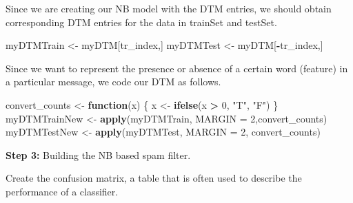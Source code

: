 \documentclass[]{article}
\newenvironment{Shaded}{\begin{snugshade}}{\end{snugshade}}
\newcommand{\CommentTok}[1]{\textcolor[rgb]{0.56,0.35,0.01}{\textit{#1}}}
\newcommand{\ControlFlowTok}[1]{\textcolor[rgb]{0.13,0.29,0.53}{\textbf{#1}}}
\newcommand{\DataTypeTok}[1]{\textcolor[rgb]{0.13,0.29,0.53}{#1}}
\newcommand{\DecValTok}[1]{\textcolor[rgb]{0.00,0.00,0.81}{#1}}
\newcommand{\KeywordTok}[1]{\textcolor[rgb]{0.13,0.29,0.53}{\textbf{#1}}}
\newcommand{\NormalTok}[1]{#1}
\newcommand{\OperatorTok}[1]{\textcolor[rgb]{0.81,0.36,0.00}{\textbf{#1}}}
\newcommand{\StringTok}[1]{\textcolor[rgb]{0.31,0.60,0.02}{#1}}
\begin{document}
Since we are creating our NB model with the DTM entries, we should
obtain corresponding DTM entries for the data in trainSet and testSet.

\begin{Shaded}
\begin{Highlighting}[]
\NormalTok{myDTMTrain <-}\StringTok{ }\NormalTok{myDTM[tr_index,]}
\NormalTok{myDTMTest <-}\StringTok{ }\NormalTok{myDTM[}\OperatorTok{-}\NormalTok{tr_index,]}
\end{Highlighting}
\end{Shaded}

Since we want to represent the presence or absence of a certain word
(feature) in a particular message, we code our DTM as follows.

\begin{Shaded}
\begin{Highlighting}[]
\NormalTok{convert_counts <-}\StringTok{ }\ControlFlowTok{function}\NormalTok{(x) \{}
\NormalTok{  x <-}\StringTok{ }\KeywordTok{ifelse}\NormalTok{(x }\OperatorTok{>}\StringTok{ }\DecValTok{0}\NormalTok{, }\StringTok{"T"}\NormalTok{, }\StringTok{"F"}\NormalTok{)}
\NormalTok{\}}
\NormalTok{myDTMTrainNew <-}\StringTok{ }\KeywordTok{apply}\NormalTok{(myDTMTrain, }\DataTypeTok{MARGIN =} \DecValTok{2}\NormalTok{,convert_counts)}
\NormalTok{myDTMTestNew <-}\StringTok{ }\KeywordTok{apply}\NormalTok{(myDTMTest, }\DataTypeTok{MARGIN =} \DecValTok{2}\NormalTok{, convert_counts)}
\end{Highlighting}
\end{Shaded}

\textbf{Step 3:} Building the NB based spam filter.

\begin{Shaded}
\end{Shaded}

Create the confusion matrix, a table that is often used to describe the
performance of a classifier.

\begin{Shaded}
\end{Shaded}
\end{document}
